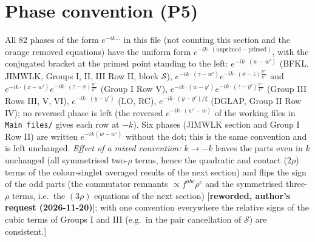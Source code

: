 {\color{red}
\section{Phase convention (P5)}
 All 82 phases of the form $e^{-ik\dots}$ in this file (not counting this section and the orange removed equations) have the uniform form $e^{-ik\cdot(\text{unprimed}-\text{primed})}$, with the conjugated bracket at the primed point standing to the left: $e^{-ik\cdot(w-w')}$ (BFKL, JIMWLK, Groups I, II, III Row II, block $\mathcal{S}$), $e^{-ik\cdot(z-w')}e^{-ik\cdot(x-z)\frac{p^{+}}{k^{+}}}$ and $e^{-ik\cdot(x-w')}e^{-ik\cdot(z-x)\frac{q^{+}}{k^{+}}}$ (Group I Row V), $e^{-ik\cdot(w-y')}e^{-ik\cdot(z-y')\frac{p^{+}}{k^{+}}}$ (Group III Rows III, V, VI), $e^{-ik\cdot(y-y')}$ (LO, RC), $e^{-ik\cdot(y-y')/\xi}$ (DGLAP, Group II Row IV); no reversed phase is left (the reversed $e^{-ik\cdot(w'-w)}$ of the working files in \texttt{Main files/} gives each row at $-k$). Six phases (JIMWLK section and Group I Row II) are written $e^{-ik(w-w')}$ without the dot; this is the same convention and is left unchanged. \emph{Effect of a mixed convention:} $k\to-k$ leaves the parts even in $k$ unchanged (all symmetrised two-$\rho$ terms, hence the quadratic and contact ($2\rho$) terms of the colour-singlet averaged results of the next section) and flips the sign of the odd parts (the commutator remnants $\propto f^{abc}\rho^{c}$ and the symmetrised three-$\rho$ terms, i.e.\ the $(3\rho)$ equations of the next section) [\textbf{reworded, author's request (2026-11-20)}]; with one convention everywhere the relative signs of the cubic terms of Groups I and III (e.g.\ in the pair cancellation of $\mathcal{S}$) are consistent.]}\par
